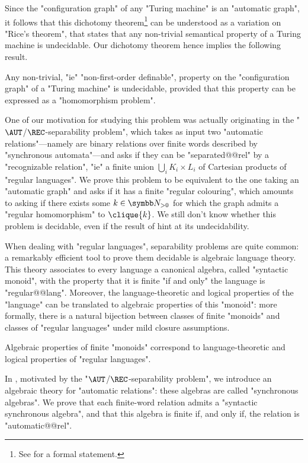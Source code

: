 Since the "configuration graph" of any "Turing machine" is an "automatic graph",
it follows that this dichotomy theorem\footnote{See  for a formal statement.} can be understood
as a variation on "Rice's theorem", that states that any non-trivial
semantical property of a Turing machine is undecidable.
Our dichotomy theorem hence implies the following result.

\begin{contribution}
	Any non-trivial, "ie" "non-first-order definable", property on the "configuration graph"
	of a "Turing machine" is undecidable, provided that this property can be expressed
	as a "homomorphism problem".
\end{contribution}

One of our motivation for studying this problem was actually originating
in the "$\AUT$/$\REC$-separability problem", which takes as input two "automatic relations"---namely are binary relations over finite words described by "synchronous automata"---and asks if they can be
"separated@@rel" by a "recognizable relation", "ie" a finite union $\bigcup_i K_i \times L_i$
of Cartesian products of "regular languages". 
We prove this problem to be equivalent to the one taking an "automatic graph" and asks
if it has a finite "regular colouring", which amounts to asking
if there exists some $k\in\Np$ for which the graph admits a "regular homomorphism" to
$\clique{k}$. We still don't know whether this problem is decidable, 
even if the result of  hint at its undecidability.

When dealing with "regular languages",
separability problems are quite common: a remarkably efficient tool
to prove them decidable is algebraic language theory.
This theory associates to every language a canonical algebra, called "syntactic monoid",
with the property that it is finite "if and only" the language is "regular@@lang".
Moreover, the language-theoretic and logical properties of the "language" can be
translated to algebraic properties of this "monoid": more formally, there is a natural
bijection between classes of finite "monoids" and classes of
"regular languages" under mild closure assumptions.

\begin{known}
	Algebraic properties of finite "monoids" correspond to
	language-theoretic and logical properties of "regular languages".
\end{known}

In , motivated by the "$\AUT$/$\REC$-separability problem",
we introduce an algebraic theory for "automatic relations": these algebras are called
"synchronous algebras".
We prove that each finite-word relation admits a "syntactic synchronous algebra",
and that this algebra is finite if, and only if, the relation is "automatic@@rel".

